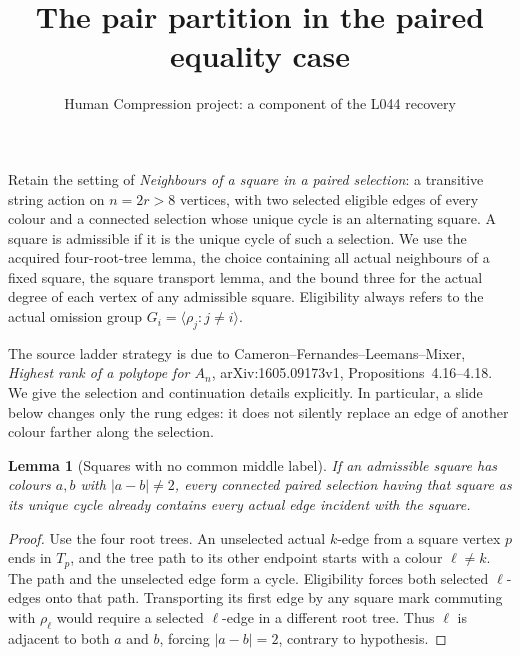 \documentclass[11pt,a4paper]{article}
\title{The pair partition in the paired equality case}
\author{Human Compression project: a component of the L044 recovery}
\date{}
\newtheorem{lemma}[theorem]{Lemma}
\newcommand{\gen}[1]{\langle#1\rangle}
\begin{document}
\maketitle
Retain the setting of \emph{Neighbours of a square in a paired
selection}: a transitive string action on $n=2r>8$ vertices,
with two selected eligible edges of every colour and a connected
selection whose unique cycle is an alternating square. A square
is admissible if it is the unique cycle of such a selection.
We use the acquired four-root-tree lemma, the choice containing
all actual neighbours of a fixed square, the square transport
lemma, and the bound three for the actual degree of each vertex
of any admissible square. Eligibility always refers to the actual
omission group $G_i=\gen{\rho_j:j\ne i}$.

The source ladder strategy is due to Cameron--Fernandes--Leemans--Mixer,
\emph{Highest rank of a polytope for $A_n$}, arXiv:1605.09173v1,
Propositions~4.16--4.18. We give the selection and continuation
details explicitly. In particular, a slide below changes only
the rung edges: it does not silently replace an edge of another
colour farther along the selection.

\begin{lemma}[Squares with no common middle label]\label{automatic}
If an admissible square has colours $a,b$ with $|a-b|\ne2$,
every connected paired selection having that square as its
unique cycle already contains every actual edge incident with
the square.
\end{lemma}
\begin{proof}
Use the four root trees. An unselected actual $k$-edge from a
square vertex $p$ ends in $T_p$, and the tree path to its other
endpoint starts with a colour $\ell\ne k$. The path and the
unselected edge form a cycle. Eligibility forces both selected
$\ell$-edges onto that path. Transporting its first edge by any
square mark commuting with $\rho_\ell$ would require a selected
$\ell$-edge in a different root tree. Thus $\ell$ is adjacent
to both $a$ and $b$, forcing $|a-b|=2$, contrary to hypothesis.
\end{proof}
\end{document}
